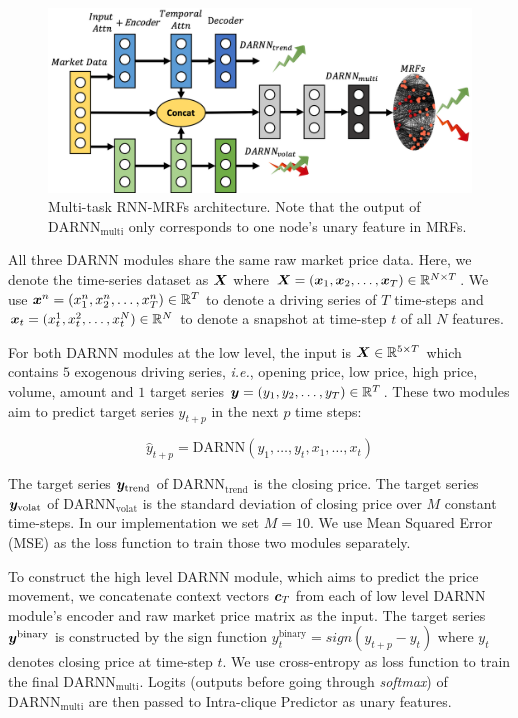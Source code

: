 \begin{figure}[t]
  \centering
  \includegraphics[width=1\columnwidth]{Part2/figures/mmplmrf.png}
  \caption{\label{fig:mrfrnn} Multi-task RNN-MRFs architecture. Note 
  that the output of $\text{DARNN}_{\text{multi}}$ only corresponds to one 
  node's unary feature in MRFs.}
\end{figure}

All three DARNN modules share the same raw market price data.
Here, we denote the time-series dataset as ${\bm{X}}$ where
${\bm{X}}=({\bm{x}}_1,{\bm{x}}_2,\dots,{\bm{x}}_T)\in {\mathbb{R}}^{N\times T}$. We use
${\bm{x}}^n=(x_1^n,x_2^n,\dots,x_T^n) \in {\mathbb{R}}^T$ to denote a driving
series of $T$ time-steps and ${\bm{x}}_t=(x_t^1,x_t^2 ,\dots
,x_t^N)\in {\mathbb{R}}^N$ to denote a snapshot at time-step $t$ of all
$N$ features.

For both DARNN modules at the low level, the input is ${\bm{X}} \in {\mathbb{R}}^{5\times T}$
which contains $5$ exogenous driving series, \textit{i.e.}, opening price, low
price, high price, volume, amount and $1$ target series ${\bm{y}} =
(y_1,y_2,\dots,y_T) \in {\mathbb{R}}^T$. These two modules
aim to predict target series $y_{t+p}$ in the next $p$ time
steps:

$$\hat{y}_{t+p} = \text{DARNN}(y_1,\dots,y_{t},x_1,\dots,x_t)$$

The target series ${\bm{y}}_{\text{trend}}$ of
$\text{DARNN}_{\text{trend}}$ is the closing price. The target series
${\bm{y}}_{\text{volat}}$ of $\text{DARNN}_{\text{volat}}$ is the
standard deviation of closing price over $M$ constant time-steps.
In our implementation we set $M=10$. We use Mean Squared Error
(MSE) as the loss function to train those two modules separately.

To construct the high level DARNN module, which aims to predict
the price movement, we concatenate context vectors ${\bm{c}}_T$ from
each of low level DARNN module's encoder and raw market price
matrix as the input. The target series ${\bm{y}}^{\text{binary}}$ is
constructed by the sign function $y_t^{\text{binary}} =
sign(y_{t+p}-y_t)$ where $y_t$ denotes closing price at time-step
$t$. We use cross-entropy as loss function to train the final
$\text{DARNN}_{\text{multi}}$. Logits (outputs before going
through \emph{softmax}) of $\text{DARNN}_{\text{multi}}$ are then
passed to Intra-clique Predictor as unary features.

